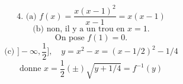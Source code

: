 \documentclass{article}
\begin{document}
\[
\text{4. (a) } f(x) = \frac{x(x-1)^2}{x-1} = x(x-1)
\]
\[
\text{(b) non, il y a un trou en } x=1.
\]
\[
\text{On pose } f(1)=0.
\]
\[
\text{(c) } ]-\infty, \frac{1}{2}], \quad y = x^2 - x = (x - 1/2)^2 - 1/4
\]
\[
\text{donne } x = \frac{1}{2} (\pm) \sqrt{y + 1/4} = f^{-1}(y)
\]
\end{document}
